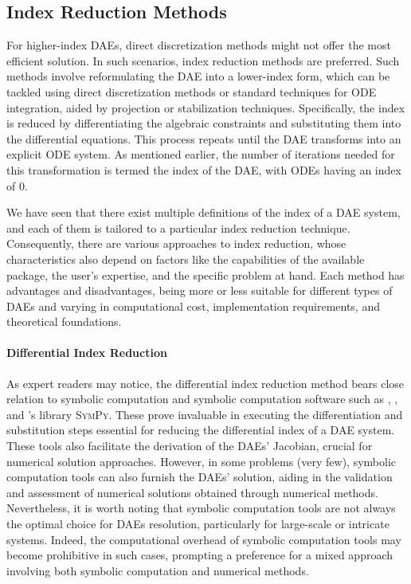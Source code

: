 \subsection{Index Reduction Methods}
\label{chap2:sec:index_reduction_methods}

For higher-index \acp{DAE}, direct discretization methods might not offer the most efficient solution. In such scenarios, index reduction methods are preferred. Such methods involve reformulating the \ac{DAE} into a lower-index form, which can be tackled using direct discretization methods or standard techniques for \ac{ODE} integration, aided by projection or stabilization techniques. Specifically, the index is reduced by differentiating the algebraic constraints and substituting them into the differential equations. This process repeats until the \ac{DAE} transforms into an explicit \ac{ODE} system. As mentioned earlier, the number of iterations needed for this transformation is termed the index of the \ac{DAE}, with \acp{ODE} having an index of 0.

We have seen that there exist multiple definitions of the index of a \ac{DAE} system, and each of them is tailored to a particular index reduction technique. Consequently, there are various approaches to index reduction, whose characteristics also depend on factors like the capabilities of the available package, the user's expertise, and the specific problem at hand. Each method has advantages and disadvantages, being more or less suitable for different types of \acp{DAE} and varying in computational cost, implementation requirements, and theoretical foundations.

\paragraph{Differential Index Reduction}

As expert readers may notice, the differential index reduction method bears close relation to symbolic computation and symbolic computation software such as \Maple{}, \Mathematica{}, and \Python{}'s library \textsc{SymPy}. These prove invaluable in executing the differentiation and substitution steps essential for reducing the differential index of a \ac{DAE} system. These tools also facilitate the derivation of the \acp{DAE}' Jacobian, crucial for numerical solution approaches. However, in some problems (very few), symbolic computation tools can also furnish the \acp{DAE}' solution, aiding in the validation and assessment of numerical solutions obtained through numerical methods. Nevertheless, it is worth noting that symbolic computation tools are not always the optimal choice for \acp{DAE} resolution, particularly for large-scale or intricate systems. Indeed, the computational overhead of symbolic computation tools may become prohibitive in such cases, prompting a preference for a mixed approach involving both symbolic computation and numerical methods.

